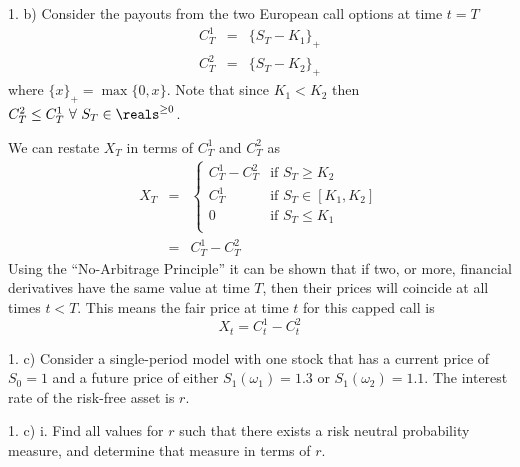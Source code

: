 \documentclass[11pt,a4paper]{article}
\begin{document}
\begin{answer}{1. b)}
  Consider the payouts from the two European call options at time $t=T$
  \[\begin{array}{rcl}
    C_T^1&=&\{S_T-K_1\}_+\\
    C_T^2&=&\{S_T-K_2\}_+
  \end{array}\]
  where $\{x\}_+=\max\{0,x\}$. Note that since $K_1<K_2$ then $C_T^2\leq C_T^1\ \forall\ S_T\in\reals^{\geq0}$.
  \par We can restate $X_T$ in terms of $C_T^1$ and $C_T^2$ as
  \[\begin{array}{rcl}
    X_T&=&\begin{cases}
      C_T^1-C_T^2&\text{if }S_T\geq K_2\\
      C_T^1&\text{if }S_T\in[K_1,K_2]\\
      0&\text{if }S_T\leq K_1\\
    \end{cases}\\
    &=&C_T^1-C_T^2
  \end{array}\]
  Using the ``No-Arbitrage Principle'' it can be shown that if two, or more, financial derivatives have the same value at time $T$, then their prices will coincide at all times $t<T$. This means the fair price at time $t$ for this capped call is
  \[ X_t=C_t^1-C_t^2 \]
\end{answer}

\begin{question}{1. c)}
  Consider a single-period model with one stock that has a current price of $S_0=1$ and a future price of either $S_1(\omega_1)=1.3$ or $S_1(\omega_2)=1.1$. The interest rate of the risk-free asset is $r$.
\end{question}

\begin{question}{1. c) i.}
  Find all values for $r$ such that there exists a risk neutral probability measure, and determine that measure in terms of $r$.
\end{question}
\end{document}
